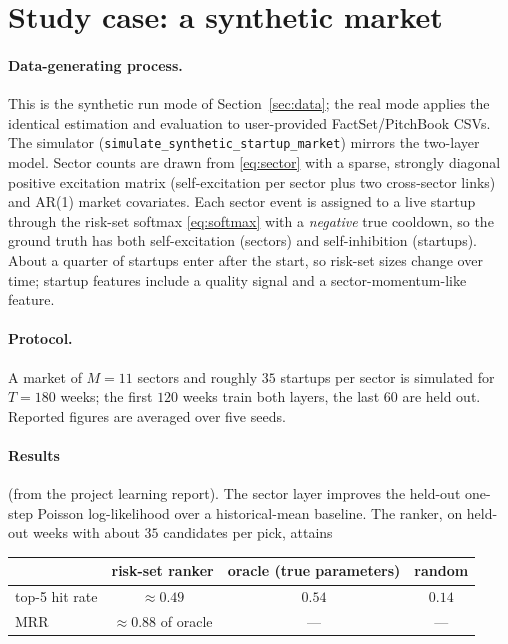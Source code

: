 \documentclass[11pt]{article}
\newcommand{\code}[1]{\texttt{#1}}
\begin{document}
\section{Study case: a synthetic market}
\label{sec:study}

\paragraph{Data-generating process.} This is the synthetic run mode of
Section~\ref{sec:data}; the real mode applies the identical estimation and evaluation to
user-provided FactSet/PitchBook CSVs. The simulator
(\code{simulate\_synthetic\_startup\_market}) mirrors the two-layer model. Sector counts
are drawn from \eqref{eq:sector} with a sparse, strongly diagonal positive excitation
matrix (self-excitation per sector plus two cross-sector links) and AR(1) market
covariates. Each sector event is assigned to a live startup through the risk-set softmax
\eqref{eq:softmax} with a \emph{negative} true cooldown, so the ground truth has both
self-excitation (sectors) and self-inhibition (startups). About a quarter of startups
enter after the start, so risk-set sizes change over time; startup features include a
quality signal and a sector-momentum-like feature.

\paragraph{Protocol.} A market of $M=11$ sectors and roughly $35$ startups per sector is
simulated for $T=180$ weeks; the first $120$ weeks train both layers, the last $60$ are
held out. Reported figures are averaged over five seeds.

\paragraph{Results} (from the project learning report). The sector layer improves the
held-out one-step Poisson log-likelihood over a historical-mean baseline. The ranker, on
held-out weeks with about $35$ candidates per pick, attains

\begin{table}[h]
\centering\small
\begin{tabular}{@{}l c c c@{}}
\toprule
& risk-set ranker & oracle (true parameters) & random \\
\midrule
top-5 hit rate & $\approx 0.49$ & $0.54$ & $0.14$ \\
MRR & \multicolumn{1}{c}{$\approx 0.88$ of oracle} & --- & --- \\
\bottomrule
\end{tabular}
\end{table}
\end{document}
